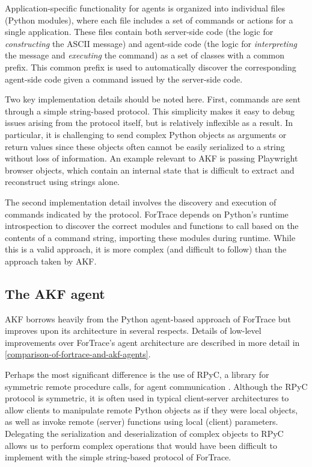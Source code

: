 Application-specific functionality for agents is organized into
individual files (Python modules), where each file includes a set of
commands or actions for a single application. These files contain both
server-side code (the logic for \emph{constructing} the ASCII message)
and agent-side code (the logic for \emph{interpreting} the message and
\emph{executing} the command) as a set of classes with a common prefix.
This common prefix is used to automatically discover the corresponding
agent-side code given a command issued by the server-side code.

Two key implementation details should be noted here. First, commands are
sent through a simple string-based protocol. This simplicity makes it
easy to debug issues arising from the protocol itself, but is relatively
inflexible as a result. In particular, it is challenging to send complex
Python objects as arguments or return values since these objects often
cannot be easily serialized to a string without loss of information. An
example relevant to AKF is passing Playwright browser objects, which
contain an internal state that is difficult to extract and reconstruct
using strings alone.

The second implementation detail involves the discovery and execution of
commands indicated by the protocol. ForTrace depends on Python's runtime
introspection to discover the correct modules and functions to call
based on the contents of a command string, importing these modules
during runtime. While this is a valid approach, it is more complex (and
difficult to follow) than the approach taken by AKF.

\subsection{The AKF agent}\label{the-akf-agent}

AKF borrows heavily from the Python agent-based approach of ForTrace but
improves upon its architecture in several respects. Details of low-level
improvements over ForTrace's agent architecture are described in more
detail in \autoref{comparison-of-fortrace-and-akf-agents}.

Perhaps the most significant difference is the use of RPyC, a library
for symmetric remote procedure calls, for agent communication
\cite{TomerfilibaorgRpyc2025}. Although the RPyC protocol is
symmetric, it is often used in typical client-server architectures to
allow clients to manipulate remote Python objects as if they were local
objects, as well as invoke remote (server) functions using local
(client) parameters. Delegating the serialization and deserialization of
complex objects to RPyC allows us to perform complex operations that
would have been difficult to implement with the simple string-based
protocol of ForTrace.

